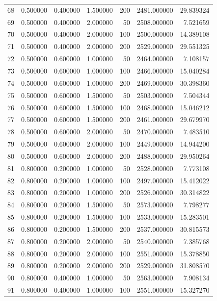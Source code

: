 \begin{longtable}{lrrrrrr}
68 & 0.500000 & 0.400000 & 1.500000 & 200 & 2481.000000 & 29.839324 \\
69 & 0.500000 & 0.400000 & 2.000000 & 50 & 2508.000000 & 7.521659 \\
70 & 0.500000 & 0.400000 & 2.000000 & 100 & 2500.000000 & 14.389108 \\
71 & 0.500000 & 0.400000 & 2.000000 & 200 & 2529.000000 & 29.551325 \\
72 & 0.500000 & 0.600000 & 1.000000 & 50 & 2464.000000 & 7.108157 \\
73 & 0.500000 & 0.600000 & 1.000000 & 100 & 2466.000000 & 15.040284 \\
74 & 0.500000 & 0.600000 & 1.000000 & 200 & 2469.000000 & 30.398360 \\
75 & 0.500000 & 0.600000 & 1.500000 & 50 & 2503.000000 & 7.504344 \\
76 & 0.500000 & 0.600000 & 1.500000 & 100 & 2468.000000 & 15.046212 \\
77 & 0.500000 & 0.600000 & 1.500000 & 200 & 2461.000000 & 29.679970 \\
78 & 0.500000 & 0.600000 & 2.000000 & 50 & 2470.000000 & 7.483510 \\
79 & 0.500000 & 0.600000 & 2.000000 & 100 & 2449.000000 & 14.944200 \\
80 & 0.500000 & 0.600000 & 2.000000 & 200 & 2488.000000 & 29.950264 \\
81 & 0.800000 & 0.200000 & 1.000000 & 50 & 2528.000000 & 7.773108 \\
82 & 0.800000 & 0.200000 & 1.000000 & 100 & 2497.000000 & 15.412022 \\
83 & 0.800000 & 0.200000 & 1.000000 & 200 & 2526.000000 & 30.314822 \\
84 & 0.800000 & 0.200000 & 1.500000 & 50 & 2573.000000 & 7.798277 \\
85 & 0.800000 & 0.200000 & 1.500000 & 100 & 2533.000000 & 15.283501 \\
86 & 0.800000 & 0.200000 & 1.500000 & 200 & 2537.000000 & 30.815573 \\
87 & 0.800000 & 0.200000 & 2.000000 & 50 & 2540.000000 & 7.385768 \\
88 & 0.800000 & 0.200000 & 2.000000 & 100 & 2551.000000 & 15.378850 \\
89 & 0.800000 & 0.200000 & 2.000000 & 200 & 2529.000000 & 31.808570 \\
90 & 0.800000 & 0.400000 & 1.000000 & 50 & 2563.000000 & 7.908134 \\
91 & 0.800000 & 0.400000 & 1.000000 & 100 & 2551.000000 & 15.327270 \\

\end{longtable}
